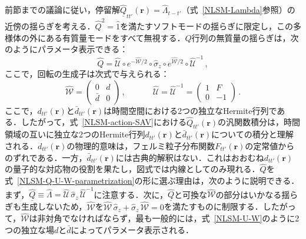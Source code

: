 \documentclass[a4paper,11pt]{ltjsarticle}
\begin{document}
前節までの議論に従い，停留解$\underline{\hat{Q}}_{tt'}(\mathbf{r})=\hat{\Lambda}_{t-t'}$（式~\eqref{NLSM-Lambda}参照）の近傍の揺らぎを考える．$\hat{Q}^{2}=\hat{1}$を満たすソフトモードの揺らぎに限定し，この多様体の外にある有質量モードをすべて無視する．$\hat Q$行列の無質量の揺らぎは，次のようにパラメータ表示できる：
\begin{equation}\label{NLSM-Q-U-W-parametrization}
\hat{Q}=\hat{\mathcal{U}}\circ
e^{-\hat{\mathcal{W}}/2}\circ\hat{\sigma}_{z}\circ
e^{\hat{\mathcal{W}}/2}\circ\hat{\mathcal{U}}^{-1}\,,
\end{equation}
ここで，回転の生成子は次式で与えられる：
\begin{equation}\label{NLSM-U-W}
\hat{\mathcal{W}}=
\left(\begin{array}{cc}0&d\\
\bar{d}&0\end{array}\right)\,,\; \quad\quad \quad
\hat{\mathcal{U}}=\hat{\mathcal{U}}^{-1}=
\left(\begin{array}{cc}1&F\\0&-1\end{array}\right)\, .
\end{equation}
ここで，$d_{tt'}(\mathbf{r})$と$\bar{d}_{tt'}(\mathbf{r})$は時間空間における2つの独立なHermite行列である．したがって，式~\eqref{NLSM-action-SAV}における$\hat{Q}_{tt'}(\mathbf{r})$の汎関数積分は，時間領域の互いに独立な2つのHermite行列$d_{tt'}(\mathbf{r})$と$\bar{d}_{tt'}(\mathbf{r})$についての積分と理解される．$d_{tt'}(\mathbf{r})$の物理的意味は，フェルミ粒子分布関数$F_{tt'}(\mathbf{r})$の定常値からのずれである．一方，$\bar{d}_{tt'}(\mathbf{r})$には古典的解釈はない．これはおおむね$d_{tt'}(\mathbf{r})$の量子的な対応物の役割を果たし，図式では内線としてのみ現れる．$\hat{Q}$を式~\eqref{NLSM-Q-U-W-parametrization}の形に選ぶ理由は，次のように説明できる．まず，$\underline{\hat{Q}}\equiv\hat{\Lambda}=
\hat{\mathcal{U}}\,\hat{\sigma}_{z}\,\hat{\mathcal{U}}^{-1}$に注意する．次に，$\underline{\hat{Q}}$と可換な$\hat{\mathcal{W}}$の部分はいかなる揺らぎも生成しないため，$\hat{\mathcal{W}}$を$\hat{\mathcal{W}}\,\hat{\sigma}_{z}+
\hat{\sigma}_{z}\,\hat{\mathcal{W}}=0$を満たすものに制限する．したがって，$\hat{\mathcal{W}}$は非対角でなければならず，最も一般的には，式~\eqref{NLSM-U-W}のように2つの独立な場$d$と$\bar{d}$によってパラメータ表示される．
\end{document}
